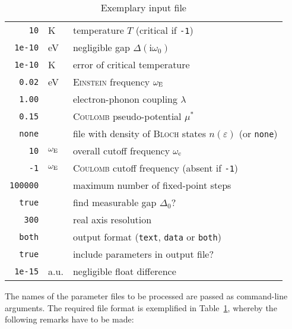 \documentclass[twocolumn]{article}
\def\I{\mathrm i}
\def\sub#1{\sb{\mathrm{#1}}}
\let\epsilon\varepsilon
\let\Delta\varDelta
\newlength\gap
\let\name\textsc
\begin{document}
   \begin{table}
      \centering
      \begin{tabular}{r @{\,} *2l}
         \verb|10| & K & temperature $T$ (critical if \verb|-1|) \\
         [\gap]
         \verb|1e-10| & eV & negligible gap $\Delta(\I \omega_0)$ \\
         \verb|1e-10| & K & error of critical temperature \\
         [\gap]
         \verb|0.02| & eV & \name{Einstein} frequency $\omega \sub E$ \\
         \verb|1.00| && electron-phonon coupling $\lambda$ \\
         \verb|0.15| && \name{Coulomb} pseudo-potential $\mu^*$ \\
         [\gap]
         \verb|none| && file with density of \name{Bloch} states $n(\epsilon)$
            (or \verb|none|) \\
         [\gap]
         \verb|10| & $\omega \sub E$
            & overall cutoff frequency $\omega \sub c$\\
         \verb|-1| & $\omega \sub E$
            & \name{Coulomb} cutoff frequency (absent if \verb|-1|) \\
         [\gap]
         \verb|100000| && maximum number of fixed-point steps \\
         [\gap]
         \verb|true| && find measurable gap $\Delta_0$? \\
         \verb|300| && real axis resolution \\
         [\gap]
         \verb|both| && output format
            (\verb|text|, \verb|data| or \verb|both|) \\
         \verb|true| && include parameters in output file? \\
         [\gap]
         \verb|1e-15| & a.u. & negligible float difference
      \end{tabular}
      \caption{Exemplary input file}
      \label{input}
   \end{table}
   The names of  the parameter files to be processed  are passed as command-line
   arguments.  The required  file  format is  exemplified in  Table~\ref{input},
   whereby the following remarks have to be made:
\end{document}
